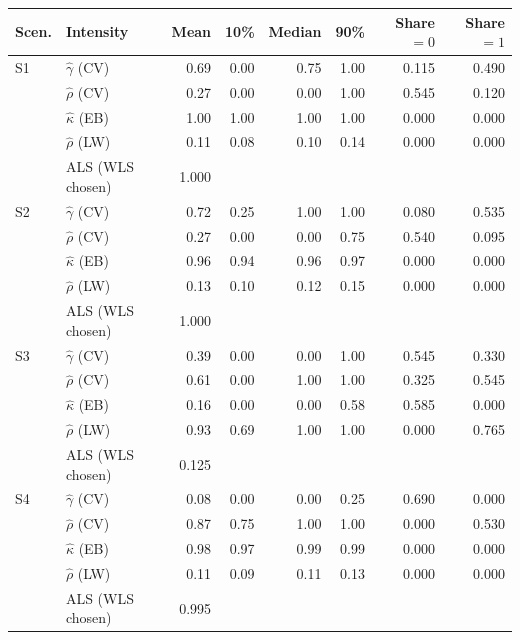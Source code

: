 \begin{tabular}{@{}llrrrrrr@{}}
\toprule
Scen. & Intensity & Mean & 10\% & Median & 90\% & Share $=0$ & Share $=1$ \\
\midrule
S1 & $\hat\gamma$ (CV) & 0.69 & 0.00 & 0.75 & 1.00 & 0.115 & 0.490 \\
 & $\hat\rho$ (CV) & 0.27 & 0.00 & 0.00 & 1.00 & 0.545 & 0.120 \\
 & $\hat\kappa$ (EB) & 1.00 & 1.00 & 1.00 & 1.00 & 0.000 & 0.000 \\
 & $\hat\rho$ (LW) & 0.11 & 0.08 & 0.10 & 0.14 & 0.000 & 0.000 \\
 & ALS (WLS chosen) & 1.000 & & & & & \\
\midrule
S2 & $\hat\gamma$ (CV) & 0.72 & 0.25 & 1.00 & 1.00 & 0.080 & 0.535 \\
 & $\hat\rho$ (CV) & 0.27 & 0.00 & 0.00 & 0.75 & 0.540 & 0.095 \\
 & $\hat\kappa$ (EB) & 0.96 & 0.94 & 0.96 & 0.97 & 0.000 & 0.000 \\
 & $\hat\rho$ (LW) & 0.13 & 0.10 & 0.12 & 0.15 & 0.000 & 0.000 \\
 & ALS (WLS chosen) & 1.000 & & & & & \\
\midrule
S3 & $\hat\gamma$ (CV) & 0.39 & 0.00 & 0.00 & 1.00 & 0.545 & 0.330 \\
 & $\hat\rho$ (CV) & 0.61 & 0.00 & 1.00 & 1.00 & 0.325 & 0.545 \\
 & $\hat\kappa$ (EB) & 0.16 & 0.00 & 0.00 & 0.58 & 0.585 & 0.000 \\
 & $\hat\rho$ (LW) & 0.93 & 0.69 & 1.00 & 1.00 & 0.000 & 0.765 \\
 & ALS (WLS chosen) & 0.125 & & & & & \\
\midrule
S4 & $\hat\gamma$ (CV) & 0.08 & 0.00 & 0.00 & 0.25 & 0.690 & 0.000 \\
 & $\hat\rho$ (CV) & 0.87 & 0.75 & 1.00 & 1.00 & 0.000 & 0.530 \\
 & $\hat\kappa$ (EB) & 0.98 & 0.97 & 0.99 & 0.99 & 0.000 & 0.000 \\
 & $\hat\rho$ (LW) & 0.11 & 0.09 & 0.11 & 0.13 & 0.000 & 0.000 \\
 & ALS (WLS chosen) & 0.995 & & & & & \\
\bottomrule
\end{tabular}
